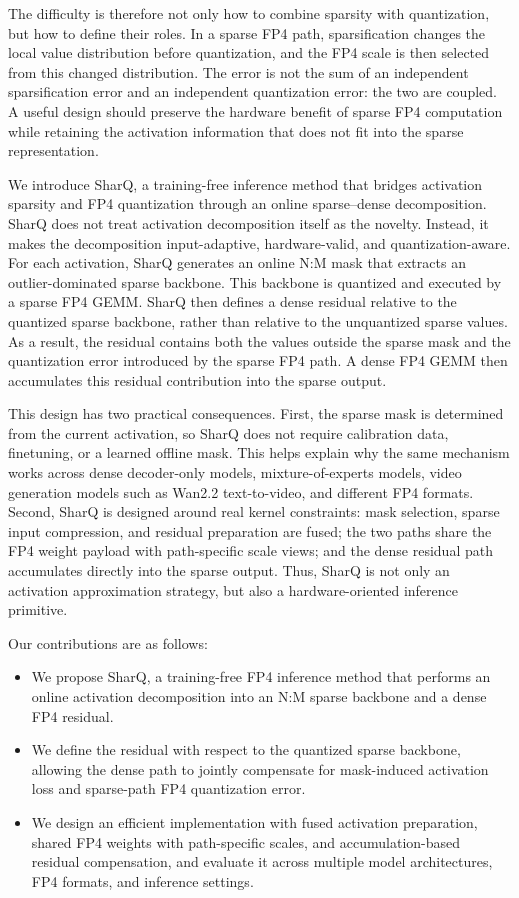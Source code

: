 \documentclass{article}
\begin{document}
The difficulty is therefore not only how to combine sparsity with quantization,
but how to define their roles. In a sparse FP4 path, sparsification changes the
local value distribution before quantization, and the FP4 scale is then selected
from this changed distribution. The error is not the sum of an independent
sparsification error and an independent quantization error: the two are coupled.
A useful design should preserve the hardware benefit of sparse FP4 computation
while retaining the activation information that does not fit into the sparse
representation.

We introduce SharQ, a training-free inference method that bridges activation
sparsity and FP4 quantization through an online sparse--dense decomposition.
SharQ does not treat activation decomposition itself as the novelty. Instead, it
makes the decomposition input-adaptive, hardware-valid, and quantization-aware.
For each activation, SharQ generates an online N:M mask that extracts an
outlier-dominated sparse backbone. This backbone is quantized and executed by a
sparse FP4 GEMM. SharQ then defines a dense residual relative to the quantized
sparse backbone, rather than relative to the unquantized sparse values. As a
result, the residual contains both the values outside the sparse mask and the
quantization error introduced by the sparse FP4 path. A dense FP4 GEMM then
accumulates this residual contribution into the sparse output.

This design has two practical consequences. First, the sparse mask is determined
from the current activation, so SharQ does not require calibration data,
finetuning, or a learned offline mask. This helps explain why the same mechanism
works across dense decoder-only models, mixture-of-experts models, video
generation models such as Wan2.2 text-to-video, and different FP4 formats.
Second, SharQ is designed around real kernel constraints: mask selection, sparse
input compression, and residual preparation are fused; the two paths share the
FP4 weight payload with path-specific scale views; and the dense residual path
accumulates directly into the sparse output. Thus, SharQ is not only an
activation approximation strategy, but also a hardware-oriented inference
primitive.

Our contributions are as follows:
\begin{itemize}
  \item We propose SharQ, a training-free FP4 inference method that performs an
  online activation decomposition into an N:M sparse backbone and a dense FP4
  residual.
  \item We define the residual with respect to the quantized sparse backbone,
  allowing the dense path to jointly compensate for mask-induced activation loss
  and sparse-path FP4 quantization error.
  \item We design an efficient implementation with fused activation preparation,
  shared FP4 weights with path-specific scales, and accumulation-based residual
  compensation, and evaluate it across multiple model architectures, FP4
  formats, and inference settings.
\end{itemize}
\end{document}
